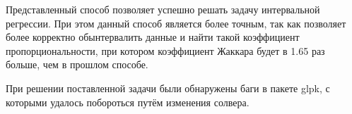 Представленный способ позволяет успешно решать задачу интервальной регрессии. При этом данный способ является более точным, так как позволяет более корректно обынтервалить данные и найти такой коэффициент пропорциональности, при котором коэффициент Жаккара будет в 1.65 раз больше, чем в прошлом способе.

При решении поставленной задачи были обнаружены баги в пакете glpk, с которыми удалось побороться путём изменения солвера.